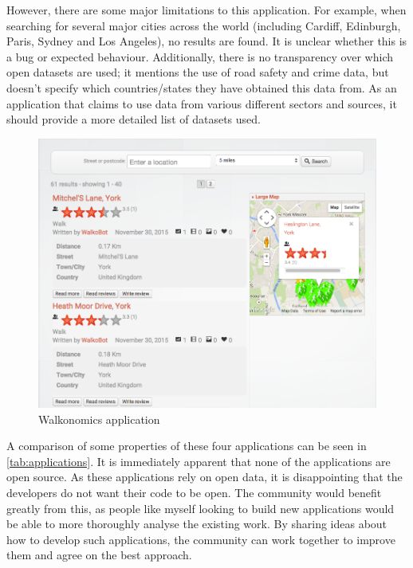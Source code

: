 \documentclass[authoryearcitations]{UoYCSproject}
\begin{document}
However, there are some major limitations to this application. For example, when searching for several major cities across the world (including Cardiff, Edinburgh, Paris, Sydney and Los Angeles), no results are found. It is unclear whether this is a bug or expected behaviour. Additionally, there is no transparency over which open datasets are used; it mentions the use of road safety and crime data, but doesn't specify which countries/states they have obtained this data from. As an application that claims to use data from various different sectors and sources, it should provide a more detailed list of datasets used.

\begin{figure}
	\includegraphics[scale=0.4]{walkonomics}
	\caption{Walkonomics application}
	\label{fig:walkonomics}
\end{figure}

A comparison of some properties of these four applications can be seen in \autoref{tab:applications}. It is immediately apparent that none of the applications are open source. As these applications rely on open data, it is disappointing that the developers do not want their code to be open. The community would benefit greatly from this, as people like myself looking to build new applications would be able to more thoroughly analyse the existing work. By sharing ideas about how to develop such applications, the community can work together to improve them and agree on the best approach.
\end{document}
